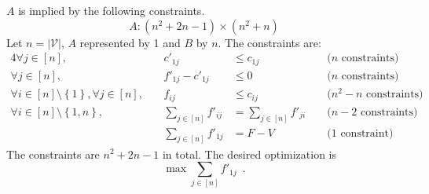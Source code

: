 $A$ is implied by the following constraints.
\begin{equation*}
  A : \left(n^2 + 2n - 1\right) \times \left(n^2 + n\right)
\end{equation*}
Let $n = |\mathcal{V}|$, $A$ represented by 1 and $B$ by $n$. The constraints are:
\begin{alignat*}{4}
  \forall j \in \left[n\right], && c'_{1j} &\leq c_{1j} &&\mbox{ ($n$ constraints)} \\
  \forall j \in \left[n\right], &\:& f'_{1j} - c'_{1j} &\leq 0 &&\mbox{ ($n$ constraints)} \\
  \forall i \in \left[n\right] \setminus \left\{1\right\}, \forall j \in \left[n\right], && f_{ij} &\leq c_{ij}
    &&\mbox{ ($n^2 - n$ constraints)} \\
  \forall i \in \left[n\right] \setminus \left\{1, n\right\}, && \sum\limits_{j \in \left[n\right]}f'_{ij} &=
    \sum\limits_{j \in \left[n\right]}f'_{ji} &&\mbox{ ($n-2$ constraints)} \\
  && \sum\limits_{j \in \left[n\right]}f'_{1j} &= F - V &&\mbox{ (1 constraint)}
\end{alignat*}
The constraints are $n^2 + 2n - 1$ in total. The desired optimization is
\begin{equation*}
  \max{\sum\limits_{j \in \left[n\right]}f'_{1j}} \enspace.
\end{equation*}
